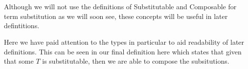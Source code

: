 
\begin{code}%
\>[0]\AgdaSpace{}%
\AgdaSymbol{:}\AgdaSpace{}%
\AgdaSpace{}%
\AgdaSpace{}%
\AgdaSpace{}%
\AgdaSpace{}%
\AgdaOperator{\AgdaFunction{\AgdaUnderscore{}⇒[}}\AgdaSpace{}%
\AgdaSpace{}%
\AgdaOperator{\AgdaFunction{]\AgdaUnderscore{}}}\<%
\\
\>[0]\AgdaOperator{\AgdaFunction{[}}\AgdaSpace{}%
\AgdaBound{/}\AgdaSpace{}%
\AgdaOperator{\AgdaFunction{]}}%
\>[7]%
\>[15]\AgdaSpace{}%
\AgdaSpace{}%
\AgdaSymbol{=}\AgdaSpace{}%
\<%
\\
\>[0]\AgdaOperator{\AgdaFunction{[}}\AgdaSpace{}%
\AgdaBound{/}\AgdaSpace{}%
\AgdaOperator{\AgdaFunction{]}}\AgdaSpace{}%
\AgdaSymbol{(}\AgdaSpace{}%
\AgdaOperator{\AgdaInductiveConstructor{-,}}\AgdaSpace{}%
\AgdaSymbol{)}\AgdaSpace{}%
\AgdaSpace{}%
\AgdaSpace{}%
\AgdaSymbol{=}\AgdaSpace{}%
\AgdaSymbol{(}\AgdaOperator{\AgdaFunction{[}}\AgdaSpace{}%
\AgdaBound{/}\AgdaSpace{}%
\AgdaOperator{\AgdaFunction{]}}\AgdaSpace{}%
\AgdaSpace{}%
\AgdaSpace{}%
\AgdaSymbol{)}\AgdaSpace{}%
\AgdaOperator{\AgdaInductiveConstructor{-,}}\AgdaSpace{}%
\AgdaBound{/}\AgdaSpace{}%
\AgdaSpace{}%
\<%
\end{code}

Although we will not use the definitions of Substitutable and Composable for
term substitution as we will soon see, these concepts will be useful in later
defintitions.

Here we have paid attention to the types in particular to aid readability of
later definitions. This can be seen in our final definition here which states
that given that some $T$ is substitutable, then we are able to compose the
subsitutions.


\usebox{\composable}

